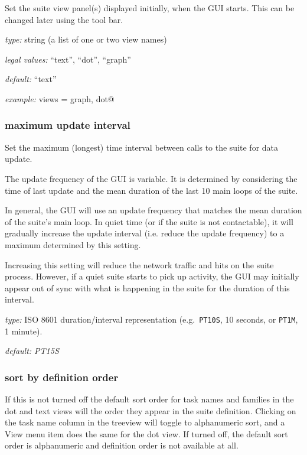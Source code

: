 Set the suite view panel(s) displayed initially, when the GUI starts.
This can be changed later using the tool bar.

\begin{myitemize}
\item {\em type:} string (a list of one or two view names)
\item {\em legal values:} ``text'', ``dot'',  ``graph''
\item {\em default:} ``text''
\item {\em example:} \lstinline@initial views = graph, dot@
\end{myitemize}

\subsubsection{maximum update interval}

Set the maximum (longest) time interval between calls to the suite for data
update.

The update frequency of the GUI is variable. It is determined by considering
the time of last update and the mean duration of the last 10 main loops of the
suite.

In general, the GUI will use an update frequency that matches the mean duration
of the suite's main loop. In quiet time (or if the suite is not contactable),
it will gradually increase the update interval (i.e. reduce the update
frequency) to a maximum determined by this setting.

Increasing this setting will reduce the network traffic and hits on the suite
process.  However, if a quiet suite starts to pick up activity, the GUI may
initially appear out of sync with what is happening in the suite for the
duration of this interval.

\begin{myitemize}
\item {\em type:} ISO 8601 duration/interval representation (e.g.\ 
\lstinline=PT10S=, 10 seconds, or \lstinline=PT1M=, 1 minute).
\item {\em default: PT15S}
\end{myitemize}

\subsubsection{sort by definition order}

If this is not turned off the default sort order for task names and
families in the dot and text views will the order they appear in the
suite definition. Clicking on the task name column in the treeview will
toggle to alphanumeric sort, and a View menu item does the same for the
dot view.  If turned off, the default sort order is alphanumeric and
definition order is not available at all.

